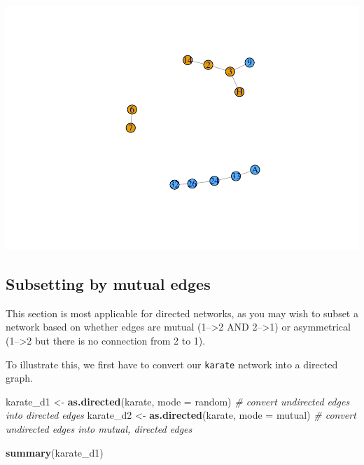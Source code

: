 \documentclass[
]{book}
\newenvironment{Shaded}{\begin{snugshade}}{\end{snugshade}}
\newcommand{\AttributeTok}[1]{\textcolor[rgb]{0.13,0.29,0.53}{#1}}
\newcommand{\CommentTok}[1]{\textcolor[rgb]{0.56,0.35,0.01}{\textit{#1}}}
\newcommand{\DecValTok}[1]{\textcolor[rgb]{0.00,0.00,0.81}{#1}}
\newcommand{\FunctionTok}[1]{\textcolor[rgb]{0.13,0.29,0.53}{\textbf{#1}}}
\newcommand{\NormalTok}[1]{#1}
\newcommand{\OtherTok}[1]{\textcolor[rgb]{0.56,0.35,0.01}{#1}}
\newcommand{\SpecialCharTok}[1]{\textcolor[rgb]{0.81,0.36,0.00}{\textbf{#1}}}
\newcommand{\StringTok}[1]{\textcolor[rgb]{0.31,0.60,0.02}{#1}}
\begin{document}
\begin{Shaded}
\end{Shaded}

\includegraphics{bookdown-demo_files/figure-latex/unnamed-chunk-50-1.pdf}

\subsection{Subsetting by mutual edges}\label{subsetting-by-mutual-edges}

This section is most applicable for directed networks, as you may wish to subset a network based on whether edges are mutual (1--\textgreater2 AND 2--\textgreater1) or asymmetrical (1--\textgreater2 but there is no connection from 2 to 1).

To illustrate this, we first have to convert our \texttt{karate} network into a directed graph.

\begin{Shaded}
\begin{Highlighting}[]
\NormalTok{karate\_d1 }\OtherTok{\textless{}{-}} \FunctionTok{as.directed}\NormalTok{(karate, }\AttributeTok{mode =} \StringTok{\textquotesingle{}random\textquotesingle{}}\NormalTok{) }\CommentTok{\# convert undirected edges into directed edges }
\NormalTok{karate\_d2 }\OtherTok{\textless{}{-}} \FunctionTok{as.directed}\NormalTok{(karate, }\AttributeTok{mode =} \StringTok{\textquotesingle{}mutual\textquotesingle{}}\NormalTok{) }\CommentTok{\# convert undirected edges into mutual, directed edges}

\FunctionTok{summary}\NormalTok{(karate\_d1)}
\end{Highlighting}
\end{Shaded}
\end{document}
